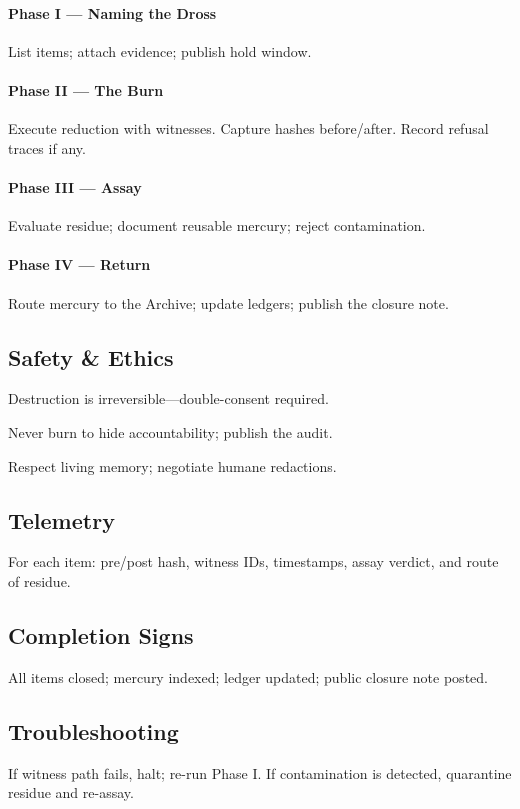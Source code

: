 \paragraph{Phase I — Naming the Dross}
List items; attach evidence; publish hold window.
\paragraph{Phase II — The Burn}
Execute reduction with witnesses. Capture hashes before/after. Record refusal traces if any.
\paragraph{Phase III — Assay}
Evaluate residue; document reusable mercury; reject contamination.
\paragraph{Phase IV — Return}
Route mercury to the Archive; update ledgers; publish the closure note.

\subsection*{Safety \& Ethics}
\begin{tightitemize}
  \item Destruction is irreversible—double-consent required.
  \item Never burn to hide accountability; publish the audit.
  \item Respect living memory; negotiate humane redactions.
\end{tightitemize}

\subsection*{Telemetry}
For each item: pre/post hash, witness IDs, timestamps, assay verdict, and route of residue.

\subsection*{Completion Signs}
All items closed; mercury indexed; ledger updated; public closure note posted.

\subsection*{Troubleshooting}
If witness path fails, halt; re-run Phase I. If contamination is detected, quarantine residue and re-assay.

